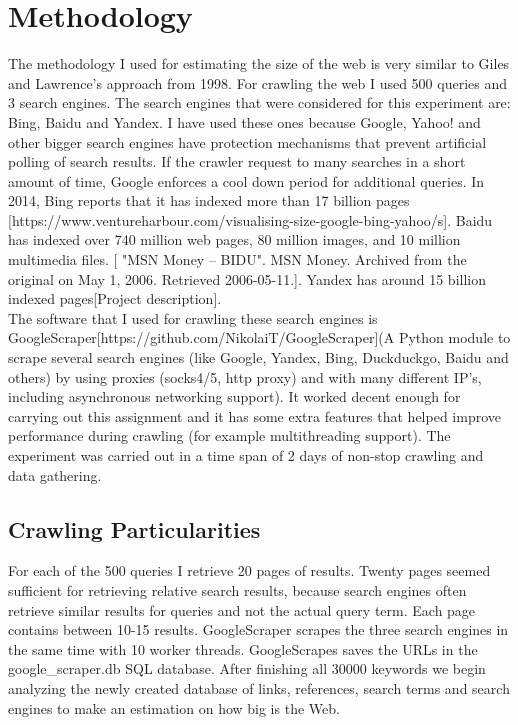 \documentclass{sig-alternate}
\begin{document}
\section{Methodology}

The methodology I used for estimating the size of the web is very similar to Giles and Lawrence's approach from 1998. For crawling the web I used 500 queries and 3 search engines. The search engines that were considered for this experiment are: Bing, Baidu and Yandex. I have used these ones because Google, Yahoo! and other bigger search engines have protection mechanisms that prevent artificial polling of search results. If the crawler request to many searches in a short amount of time, Google enforces a cool down period for additional queries. In 2014, Bing reports that it has indexed more than 17 billion pages [https://www.ventureharbour.com/visualising-size-google-bing-yahoo/s]. Baidu has indexed over 740 million web pages, 80 million images, and 10 million multimedia files. [ "MSN Money – BIDU". MSN Money. Archived from the original on May 1, 2006. Retrieved 2006-05-11.]. Yandex has around 15 billion indexed pages[Project description].\\

The software that I used for crawling these search engines is GoogleScraper[https://github.com/NikolaiT/GoogleScraper](A Python module to scrape several search engines (like Google, Yandex, Bing, Duckduckgo, Baidu and others) by using proxies (socks4/5, http proxy) and with many different IP's, including asynchronous networking support). It worked decent enough for carrying out this assignment and it has some extra features that helped improve performance during crawling (for example multithreading support). The experiment was carried out in a time span of 2 days of non-stop crawling and data gathering.\\ 

\subsection{Crawling Particularities}

For each of the 500 queries I retrieve 20 pages of results. Twenty pages seemed sufficient for retrieving relative search results, because search engines often retrieve similar results for queries and not the actual query term. Each page contains between 10-15 results. GoogleScraper scrapes the three search engines in the same time with 10 worker threads. GoogleScrapes saves the URLs in the google\_scraper.db SQL database. After finishing all 30000 keywords we begin analyzing the newly created database of links, references, search terms and search engines to make an estimation on how big is the Web.\\
\end{document}
